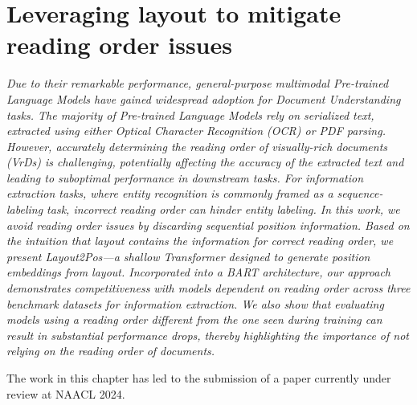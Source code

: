 
\chapter{Leveraging layout to mitigate reading order issues}
\label{chapter:layout2pos}

\renewcommand{\leftmark}{\spacedlowsmallcaps{Leveraging layout to mitigate reading order issues}}

\begin{chapabstract}
    {\em
    Due to their remarkable performance, general-purpose multimodal Pre-trained Language Models have gained widespread adoption for Document Understanding tasks. The majority of Pre-trained Language Models rely on serialized text, extracted using either Optical Character Recognition (OCR) or PDF parsing. However, accurately determining the reading order of visually-rich documents (VrDs) is challenging, potentially affecting the accuracy of the extracted text and leading to suboptimal performance in downstream tasks. For information extraction tasks, where entity recognition is commonly framed as a sequence-labeling task, incorrect reading order can hinder entity labeling. In this work, we avoid reading order issues by discarding sequential position information. Based on the intuition that layout contains the information for correct reading order, we present Layout2Pos—a shallow Transformer designed to generate position embeddings from layout. Incorporated into a BART architecture, our approach demonstrates competitiveness with models dependent on reading order across three benchmark datasets for information extraction. We also show that evaluating models using a reading order different from the one seen during training can result in substantial performance drops, thereby highlighting the importance of not relying on the reading order of documents. \\
    \vspace*{5mm}

    The work in this chapter has led to the submission of a paper currently under review at NAACL 2024.}
\end{chapabstract}



\newpage

\minitoc
{}

